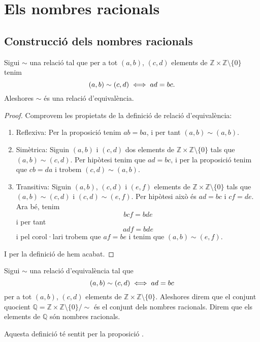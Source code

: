 \documentclass[../Apunts.tex]{subfiles}
\begin{document}
	\section{Els nombres racionals}
	\subsection{Construcció dels nombres racionals}
	\begin{proposition}
		\label{prop:nombres racionals}
		Sigui \(\sim\) una relació tal que per a tot \((a,b)\), \((c,d)\) elements de \(\mathbb{Z}\times\mathbb{Z}\setminus\{0\}\) tenim
		\[(a,b)\sim(c,d)\iff ad=bc.\]
		Aleshores \(\sim\) és una relació d'equivalència.
		\begin{proof}
			Comprovem les propietats de la definició de relació d'equivalència:
			\begin{enumerate}
				\item Reflexiva: Per la proposició  tenim \(ab=ba\), i per tant \((a,b)\sim(a,b)\).
				\item Simètrica: Siguin \((a,b)\) i \((c,d)\) dos elements de \(\mathbb{Z}\times\mathbb{Z}\setminus\{0\}\) tals que \((a,b)\sim(c,d)\). Per hipòtesi tenim que \(ad=bc\), i per la proposició  tenim que \(cb=da\) i trobem \((c,d)\sim(a,b)\).
				\item Transitiva:  Siguin \((a,b)\), \((c,d)\) i \((e,f)\) elements de \(\mathbb{Z}\times\mathbb{Z}\setminus\{0\}\) tals que \((a,b)\sim(c,d)\) i \((c,d)\sim(e,f)\). Per hipòtesi això és \(ad=bc\) i \(cf=de\). Ara bé, tenim
				\[bcf=bde\]
				i per tant
				\[adf=bde\]
				i pel corol·lari  trobem que \(af=be\) i tenim que \((a,b)\sim(e,f)\).
			\end{enumerate}
			I per la definició de  hem acabat.
		\end{proof}
	\end{proposition}
	\begin{definition}
		\label{def:nombres racionals}
		Sigui \(\sim\) una relació d'equivalència tal que
		\[(a,b)\sim(c,d)\iff ad=bc\]
		per a tot \((a,b)\), \((c,d)\) elements de \(\mathbb{Z}\times\mathbb{Z}\setminus\{0\}\).
		Aleshores direm que el conjunt quocient \(\mathbb{Q}=\mathbb{Z}\times\mathbb{Z}\setminus\{0\}/\sim\) és el conjunt dels nombres racionals. Direm que els elements de \(\mathbb{Q}\) són nombres racionals.
		
		Aquesta definició té sentit per la proposició .
	\end{definition}
\end{document}
